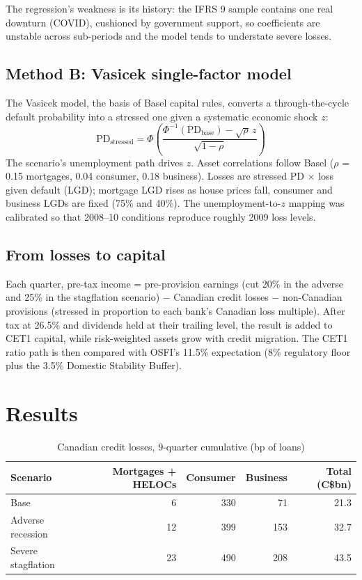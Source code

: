 \documentclass[11pt,letterpaper]{article}
\begin{document}
The regression's weakness is its history: the IFRS 9 sample contains one real downturn (COVID), cushioned by government support, so coefficients are unstable across sub-periods and the model tends to understate severe losses.

\subsection{Method B: Vasicek single-factor model}
The Vasicek model, the basis of Basel capital rules, converts a through-the-cycle default probability into a stressed one given a systematic economic shock $z$:
\[
\text{PD}_{\text{stressed}} = \Phi\!\left( \frac{\Phi^{-1}(\text{PD}_{\text{base}}) - \sqrt{\rho}\, z}{\sqrt{1-\rho}} \right)
\]
The scenario's unemployment path drives $z$. Asset correlations follow Basel ($\rho$ = 0.15 mortgages, 0.04 consumer, 0.18 business). Losses are stressed PD $\times$ loss given default (LGD); mortgage LGD rises as house prices fall, consumer and business LGDs are fixed (75\% and 40\%). The unemployment-to-$z$ mapping was calibrated so that 2008--10 conditions reproduce roughly 2009 loss levels.

\subsection{From losses to capital}
Each quarter, pre-tax income = pre-provision earnings (cut 20\% in the adverse and 25\% in the stagflation scenario) $-$ Canadian credit losses $-$ non-Canadian provisions (stressed in proportion to each bank's Canadian loss multiple). After tax at 26.5\% and dividends held at their trailing level, the result is added to CET1 capital, while risk-weighted assets grow with credit migration. The CET1 ratio path is then compared with OSFI's 11.5\% expectation (8\% regulatory floor plus the 3.5\% Domestic Stability Buffer).

\section{Results}

\begin{table}[H]\centering\small
\caption{Canadian credit losses, 9-quarter cumulative (bp of loans)}
\begin{tabular}{@{}lrrrr@{}}\toprule
Scenario & Mortgages + HELOCs & Consumer & Business & Total (C\$bn) \\ \midrule
Base & 6 & 330 & 71 & 21.3 \\
Adverse recession & 12 & 399 & 153 & 32.7 \\
Severe stagflation & 23 & 490 & 208 & 43.5 \\ \bottomrule
\end{tabular}
\end{table}
\end{document}
